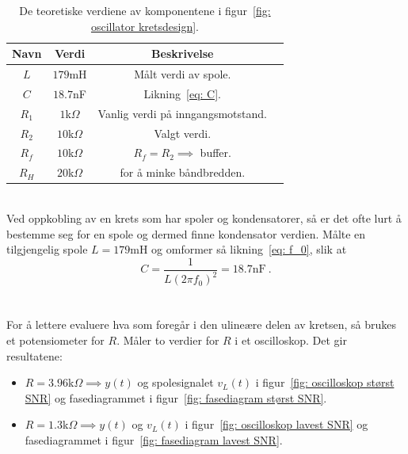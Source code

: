 \documentclass[a4paper,11pt,norsk]{article}
\begin{document}
\begin{table}[htbp]
\centering
\begin{tabular}{ |c|c|c|c| } 
\hline
\textbf{Navn} & \textbf{Verdi} & \textbf{Beskrivelse}\\
\hline
$L$ & $179$mH & Målt verdi av spole. \\
\hline
$C$ & $18.7$nF & Likning~\ref{eq: C}.
\\
\hline
$R_1$ & $1$k$\Omega$ & Vanlig verdi på inngangsmotstand.
\\
\hline
$R_2$ & $10$k$\Omega$ & Valgt verdi.
\\
\hline
$R_f$ & $10$k$\Omega$ & $R_f = R_2 \implies$ buffer.
\\
\hline
$R_H$ & $20$k$\Omega$ & for å minke båndbredden.
\\
\hline
\end{tabular}
\caption{De teoretiske verdiene av komponentene i figur~\ref{fig: oscillator kretsdesign}. }
\label{table: teoretiske verdier}
\end{table}
\\
Ved oppkobling av en krets som har spoler og kondensatorer, så er det ofte lurt å bestemme seg for en spole og dermed finne kondensator verdien.
Målte en tilgjengelig spole $L = 179$mH og omformer så likning~\ref{eq: f_0}, slik at  \\
\begin{equation} \label{eq: C}
    C = \frac{1}{L(2\pi f_0)^2} = 18.7\textrm{nF} \: .
\end{equation} \\
\\
\newpage
For å lettere evaluere hva som foregår i den ulineære delen av kretsen, så brukes et potensiometer for $R$. Måler to verdier for $R$ i et oscilloskop. Det gir resultatene: \\
\begin{itemize}
    \item $R = 3.96$k$\Omega \implies y(t)$ og spolesignalet $v_L(t)$ i figur~\ref{fig: oscilloskop størst SNR} og fasediagrammet i figur~\ref{fig: fasediagram størst SNR}.
    \item $R = 1.3$k$\Omega \implies y(t)$ og $v_L(t)$ i figur~\ref{fig: oscilloskop lavest SNR} og fasediagrammet i figur~\ref{fig: fasediagram lavest SNR}.
\end{itemize} \\
\end{document}
